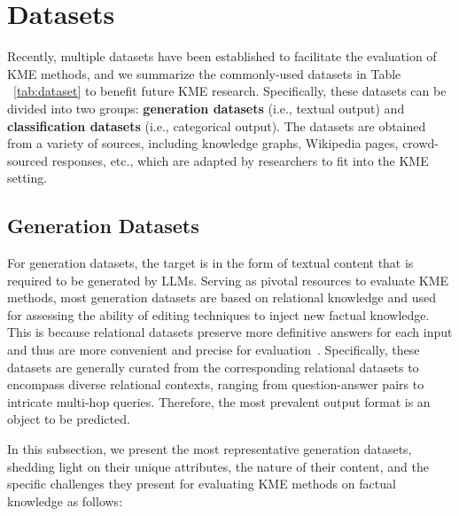 \documentclass[acmsmall, screen]{acmart}
\begin{document}





\section{Datasets}\label{sec:dataset}
Recently, multiple datasets have been established to facilitate the evaluation of KME methods, and we summarize the commonly-used datasets in Table ~\ref{tab:dataset} to benefit future KME research. Specifically, these datasets can be divided into two groups: \textbf{generation datasets} (i.e., textual output) and \textbf{classification datasets} (i.e.,  categorical output). The datasets are obtained from a variety of sources, including knowledge graphs, Wikipedia pages, crowd-sourced responses, etc., which are adapted by researchers to fit into the KME setting.


\subsection{Generation Datasets}
For generation datasets, the target is in the form of textual content that is required to be generated by LLMs.
Serving as pivotal resources to evaluate KME methods, most generation datasets are based on relational knowledge and used for assessing the ability of editing techniques to inject new factual knowledge. This is because relational datasets preserve more definitive answers for each input and thus are more convenient and precise for evaluation~\cite{zhang2024comprehensive,yao2023editing}. Specifically, these datasets are generally curated from the corresponding relational datasets to encompass diverse relational contexts, ranging from question-answer pairs to intricate multi-hop queries. Therefore, the most prevalent output format is an object to be predicted.

In this subsection, we present the most representative generation datasets, shedding light on their unique attributes, the nature of their content, and the specific challenges they present for evaluating KME methods on factual knowledge as follows:
\end{document}
